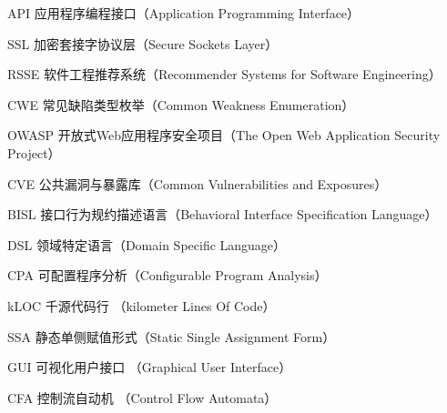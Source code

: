 \begin{denotation}[3cm]
\item[API] 应用程序编程接口（Application Programming Interface）
\item[SSL] 加密套接字协议层（Secure Sockets Layer）
\item[RSSE] 软件工程推荐系统（Recommender Systems for Software Engineering）
\item[CWE] 常见缺陷类型枚举（Common Weakness Enumeration）
\item[OWASP] 开放式Web应用程序安全项目（The Open Web Application Security Project）
\item[CVE] 公共漏洞与暴露库（Common Vulnerabilities and Exposures）
\item[BISL] 接口行为规约描述语言（Behavioral Interface Specification Language）
\item[DSL] 领域特定语言（Domain Specific Language）
\item[CPA] 可配置程序分析（Configurable Program Analysis）
\item[kLOC] 千源代码行 （kilometer Lines Of Code）
\item[SSA] 静态单侧赋值形式（Static Single Assignment Form）
\item[GUI] 可视化用户接口 （Graphical User Interface）
\item[CFA] 控制流自动机 （Control Flow Automata）
\end{denotation}
